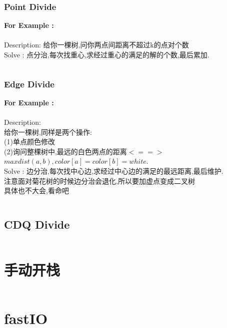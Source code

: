 \documentclass[a4paper,10pt]{article}
\begin{document}
                \subsubsection{Point Divide}
                    \textbf{For Example :}\\
                    \\
                    Description: 给你一棵树,问你两点间距离不超过k的点对个数\\
                    Solve      : 点分治,每次找重心,求经过重心的满足的解的个数,最后累加.
                    \inputminted[breaklines]{c++}{Other/point-divide.cc}
                \newpage
                \subsubsection{Edge Divide}
                    \textbf{For Example :}\\
                    \\
                    Description: \\
                    给你一棵树,同样是两个操作:\\
                    (1)单点颜色修改\\
                    (2)询问整棵树中,最远的白色两点的距离$<==>$ $max{dist(a,b)},color[a]=color[b]=white$.\\
                    Solve      : 边分治,每次找中心边,求经过中心边的满足的最远距离,最后维护.\\
                    注意面对菊花树的时候边分治会退化,所以要加虚点变成二叉树\\
                    具体也不大会,看命吧\\
                    \inputminted[breaklines]{c++}{Other/edge-divide.cc}
            \newpage
            \subsection{CDQ Divide}
                \inputminted[breaklines]{c++}{Other/cdq-divide.cc}
                  
        \newpage
		\section{手动开栈}
			\inputminted[breaklines]{c++}{Other/stack.cc}
		\section{fastIO}
			\inputminted[breaklines]{c++}{Other/fastio.cc}
		\newpage
\end{document}
